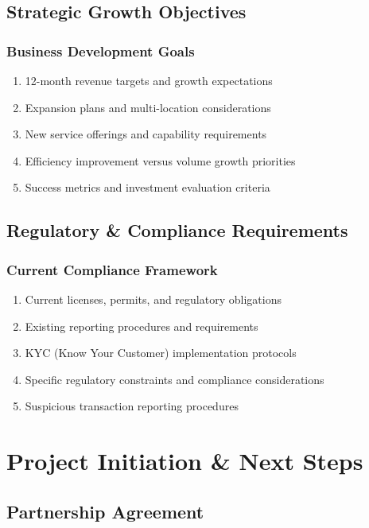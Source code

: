 \documentclass[11pt, letterpaper]{article}
\begin{document}
\subsection{Strategic Growth Objectives}

\subsubsection{Business Development Goals}
\begin{enumerate}[leftmargin=*]
    \item 12-month revenue targets and growth expectations
    \item Expansion plans and multi-location considerations
    \item New service offerings and capability requirements
    \item Efficiency improvement versus volume growth priorities
    \item Success metrics and investment evaluation criteria
\end{enumerate}

\subsection{Regulatory \& Compliance Requirements}

\subsubsection{Current Compliance Framework}
\begin{enumerate}[leftmargin=*]
    \item Current licenses, permits, and regulatory obligations
    \item Existing reporting procedures and requirements
    \item KYC (Know Your Customer) implementation protocols
    \item Specific regulatory constraints and compliance considerations
    \item Suspicious transaction reporting procedures
\end{enumerate}

\section{Project Initiation \& Next Steps}

\subsection{Partnership Agreement}
\end{document}
